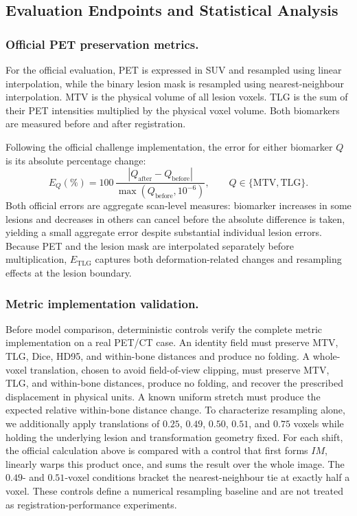 \begin{journaladdition}
\subsection{Evaluation Endpoints and Statistical Analysis}
\label{sec:evaluation}
\subsubsection{Official PET preservation metrics.}
\label{sec:pet_evaluation_metrics}
For the official evaluation, PET is expressed in SUV and resampled using linear interpolation, while the binary lesion mask is resampled using nearest-neighbour interpolation. MTV is the physical volume of all lesion voxels. TLG is the sum of their PET intensities multiplied by the physical voxel volume. Both biomarkers are measured before and after registration.

Following the official challenge implementation, the error for either biomarker $Q$ is its absolute percentage change:
\begin{equation}
  E_Q(\%)=100\,
  \frac{|Q_{\mathrm{after}}-Q_{\mathrm{before}}|}
  {\max(Q_{\mathrm{before}},10^{-6})},
  \qquad Q\in\{\mathrm{MTV},\mathrm{TLG}\}.
  \label{eq:official_pet_error}
\end{equation}
Both official errors are aggregate scan-level measures: biomarker increases in some lesions and decreases in others can cancel before the absolute difference is taken, yielding a small aggregate error despite substantial individual lesion errors.
Because PET and the lesion mask are interpolated separately before multiplication, $E_{\mathrm{TLG}}$ captures both deformation-related changes and resampling effects at the lesion boundary.

\subsubsection{Metric implementation validation.}
Before model comparison, deterministic controls verify the complete metric implementation on a real PET/CT case.
An identity field must preserve MTV, TLG, Dice, HD95, and within-bone distances and produce no folding.
A whole-voxel translation, chosen to avoid field-of-view clipping, must preserve MTV, TLG, and within-bone distances, produce no folding, and recover the prescribed displacement in physical units.
A known uniform stretch must produce the expected relative within-bone distance change.
To characterize resampling alone, we additionally apply translations of $0.25$, $0.49$, $0.50$, $0.51$, and $0.75$ voxels while holding the underlying lesion and transformation geometry fixed.
For each shift, the official calculation above is compared with a control that first forms $I M$, linearly warps this product once, and sums the result over the whole image.
The $0.49$- and $0.51$-voxel conditions bracket the nearest-neighbour tie at exactly half a voxel.
These controls define a numerical resampling baseline and are not treated as registration-performance experiments.


\end{journaladdition}
